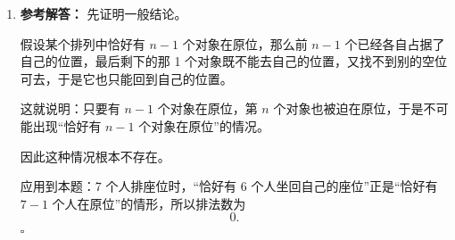 \documentclass[11pt,a4paper,fontset=fandol]{ctexart}
\newenvironment{solution}{\par\noindent\textbf{参考解答：}}{\hfill$\square$\par}
\begin{document}
\begin{enumerate}
  \item \begin{solution}
  先证明一般结论。

  假设某个排列中恰好有 $n-1$ 个对象在原位，那么前 $n-1$ 个已经各自占据了自己的位置，最后剩下的那 1 个对象既不能去自己的位置，又找不到别的空位可去，于是它也只能回到自己的位置。

  这就说明：只要有 $n-1$ 个对象在原位，第 $n$ 个对象也被迫在原位，于是不可能出现“恰好有 $n-1$ 个对象在原位”的情况。

  因此这种情况根本不存在。

  应用到本题：7 个人排座位时，“恰好有 6 个人坐回自己的座位”正是“恰好有 $7-1$ 个人在原位”的情形，所以排法数为
  \[
  0.
  \]
  \end{solution}
\end{enumerate}
\end{document}
